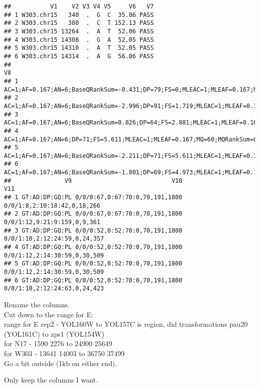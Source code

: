 \documentclass[
]{article}
\begin{document}
\begin{verbatim}
##           V1    V2 V3 V4 V5     V6   V7
## 1 W303.chr15   340  .  G  C  35.06 PASS
## 2 W303.chr15   380  .  C  T 152.13 PASS
## 3 W303.chr15 13264  .  A  T  52.06 PASS
## 4 W303.chr15 14308  .  G  A  52.05 PASS
## 5 W303.chr15 14310  .  A  T  52.05 PASS
## 6 W303.chr15 14314  .  A  G  56.06 PASS
##                                                                                                                                            V8
## 1     AC=1;AF=0.167;AN=6;BaseQRankSum=-0.431;DP=79;FS=0;MLEAC=1;MLEAF=0.167;MQ=58.36;MQRankSum=-2.287;QD=3.51;ReadPosRankSum=-2.287;SOR=0.169
## 2 AC=1;AF=0.167;AN=6;BaseQRankSum=-2.996;DP=91;FS=1.719;MLEAC=1;MLEAF=0.167;MQ=54.95;MQRankSum=-4.218;QD=7.24;ReadPosRankSum=-0.818;SOR=0.368
## 3   AC=1;AF=0.167;AN=6;BaseQRankSum=0.826;DP=64;FS=2.881;MLEAC=1;MLEAF=0.167;MQ=42.96;MQRankSum=-1.025;QD=4.34;ReadPosRankSum=0.215;SOR=1.721
## 4                                                   AC=1;AF=0.167;AN=6;DP=71;FS=5.611;MLEAC=1;MLEAF=0.167;MQ=60;MQRankSum=0;QD=3.72;SOR=0.027
## 5          AC=1;AF=0.167;AN=6;BaseQRankSum=-2.211;DP=71;FS=5.611;MLEAC=1;MLEAF=0.167;MQ=60;MQRankSum=0;QD=3.72;ReadPosRankSum=0.183;SOR=0.027
## 6           AC=1;AF=0.167;AN=6;BaseQRankSum=-1.801;DP=69;FS=4.973;MLEAC=1;MLEAF=0.167;MQ=60;MQRankSum=0;QD=4.67;ReadPosRankSum=0.43;SOR=0.039
##               V9                            V10                          V11
## 1 GT:AD:DP:GQ:PL 0/0/0:67,0:67:70:0,70,191,1800  0/0/1:8,2:10:18:42,0,18,266
## 2 GT:AD:DP:GQ:PL 0/0/0:67,0:67:70:0,70,191,1800  0/0/1:12,9:21:9:159,0,9,361
## 3 GT:AD:DP:GQ:PL 0/0/0:52,0:52:70:0,70,191,1800 0/0/1:10,2:12:24:59,0,24,357
## 4 GT:AD:DP:GQ:PL 0/0/0:52,0:52:70:0,70,191,1800 0/0/1:12,2:14:30:59,0,30,509
## 5 GT:AD:DP:GQ:PL 0/0/0:52,0:52:70:0,70,191,1800 0/0/1:12,2:14:30:59,0,30,509
## 6 GT:AD:DP:GQ:PL 0/0/0:52,0:52:70:0,70,191,1800 0/0/1:10,2:12:24:63,0,24,423
\end{verbatim}

Rename the columns.\\
Cut down to the range for E:\\
range for E rep2 - YOL160W to YOL157C is region, did transformations
pau20 (YOL161C) to zps1 (YOL154W)\\
for N17 - 1590 2276 to 24900 25649\\
for W303 - 13641 14003 to 36750 37499\\
Go a bit outside (1kb on either end).

Only keep the columns I want.\\
\end{document}

